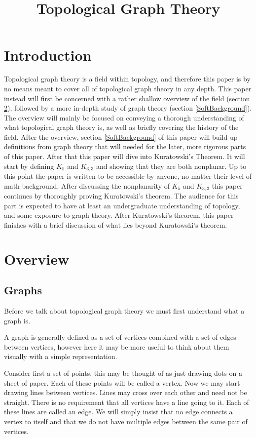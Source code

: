 \documentclass{article}
\title{Topological Graph Theory}
\begin{document}
\maketitle
\tableofcontents



\section{Introduction}
Topological graph theory is a field within topology, and therefore this paper is by no means meant to cover all of topological graph theory in any depth. This paper instead will first be concerned with a rather shallow overview of the field (section \ref{SoftOverview}), followed by a more in-depth study of graph theory (section \ref{SoftBackground}). The overview will mainly be focused on conveying a thorough understanding of what topological graph theory is, as well as briefly covering the history of the field. After the overview, section \ref{SoftBackground} of this paper will build up definitions from graph theory that will needed for the later, more rigorous parts of this paper. After that this paper will dive into Kuratowski's Theorem. It will start by defining $K_5$ and $K_{3,3}$ and showing that they are both nonplanar. Up to this point the paper is written to be accessible by anyone, no matter their level of math background. After discussing the nonplanarity of $K_5$ and $K_{3,3}$ this paper continues by thoroughly proving Kuratowski's theorem. The audience for this part is expected to have at least an undergraduate understanding of topology, and some exposure to graph theory. After Kuratowski's theorem, this paper finishes with a brief discussion of what lies beyond Kuratowski's theorem.

\section{Overview} \label{SoftOverview}
\subsection{Graphs}
Before we talk about topological graph theory we must first understand what a graph is.

A graph is generally defined as a set of vertices combined with a set of edges between vertices, however here it may be more useful to think about them visually with a simple representation.

Consider first a set of points, this may be thought of as just drawing dots on a sheet of paper. Each of these points will be called a vertex. Now we may start drawing lines between vertices. Lines may cross over each other and need not be straight. There is no requirement that all vertices have a line going to it. Each of these lines are called an edge. We will simply insist that no edge connects a vertex to itself and that we do not have multiple edges between the same pair of vertices.
\end{document}
